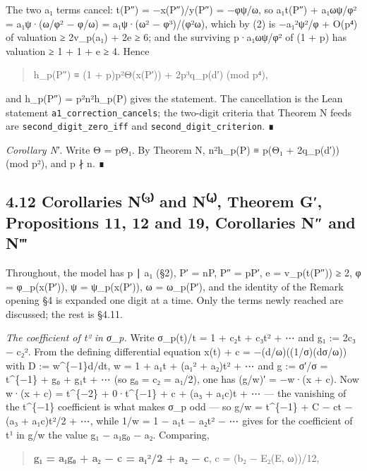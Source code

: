 \documentclass[11pt,a4paper]{article}
\theoremstyle{named}
\begin{document}
The two a₁ terms cancel: t(P″) = −x(P″)/y(P″) = −φψ/ω, so a₁t(P″) + a₁ωψ/φ² = a₁ψ·(ω/φ² − φ/ω) = a₁ψ·(ω² − φ³)/(φ²ω), which by (2) is −a₁²ψ²/φ + O(p⁴) of valuation ≥ 2v\_p(a₁) + 2e ≥ 6; and the surviving p·a₁ωψ/φ² of (1 + p) has valuation ≥ 1 + 1 + e ≥ 4. Hence

\begin{quote}
h\_p(P″) ≡ (1 + p)p²Θ(x(P′)) + 2p³q\_p(d′) (mod p⁴),
\end{quote}

and h\_p(P″) = p²n²h\_p(P) gives the statement. The cancellation is the Lean statement \texttt{a1\_\allowbreak{}correction\_\allowbreak{}cancels}; the two-digit criteria that Theorem N feeds are \texttt{second\_\allowbreak{}digit\_\allowbreak{}zero\_\allowbreak{}iff} and \texttt{second\_\allowbreak{}digit\_\allowbreak{}criterion}. ∎

\textit{Corollary N′.} Write Θ = pΘ₁. By Theorem N, n²h\_p(P) ≡ p(Θ₁ + 2q\_p(d′)) (mod p²), and p ∤ n. ∎

\subsection*{4.12 Corollaries N⁽³⁾ and N⁽⁴⁾, Theorem G′, Propositions 11, 12 and 19, Corollaries N″ and N‴}

Throughout, the model has p ∣ a₁ (§2), P′ = nP, P″ = pP′, e = v\_p(t(P″)) ≥ 2, φ = φ\_p(x(P′)), ψ = ψ\_p(x(P′)), ω = ω\_p(P′), and the identity of the Remark opening §4 is expanded one digit at a time. Only the terms newly reached are discussed; the rest is §4.11.

\textit{The coefficient of t² in σ\_p.} Write σ\_p(t)/t = 1 + c₂t + c₃t² + ⋯ and g₁ := 2c₃ − c₂². From the defining differential equation x(t) + c = −(d/ω)((1/σ)(dσ/ω)) with D := w\textasciicircum{}\{−1\}d/dt, w = 1 + a₁t + (a₁² + a₂)t² + ⋯ and g := σ′/σ = t\textasciicircum{}\{−1\} + g₀ + g₁t + ⋯ (so g₀ = c₂ = a₁/2), one has (g/w)′ = −w·(x + c). Now w·(x + c) = t\textasciicircum{}\{−2\} + 0·t\textasciicircum{}\{−1\} + c + (a₃ + a₁c)t + ⋯ — the vanishing of the t\textasciicircum{}\{−1\} coefficient is what makes σ\_p odd — so g/w = t\textasciicircum{}\{−1\} + C − ct − (a₃ + a₁c)t²/2 + ⋯, while 1/w = 1 − a₁t − a₂t² − ⋯ gives for the coefficient of t¹ in g/w the value g₁ − a₁g₀ − a₂. Comparing,

\begin{quote}
\textbf{g₁ = a₁g₀ + a₂ − c = a₁²/2 + a₂ − c},  c = (b₂ − E₂(E, ω))/12,
\end{quote}
\end{document}
